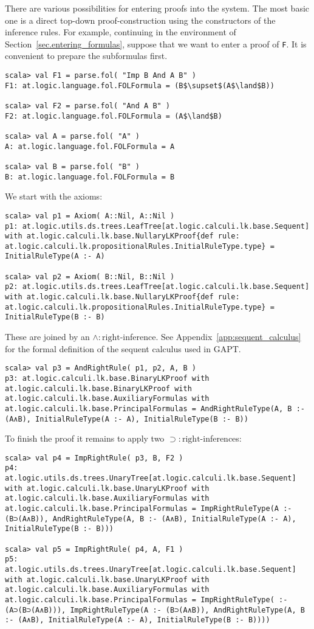 \documentclass[a4paper,11pt]{article}
\newcommand{\impl}{\supset} %
\renewcommand{\land}{\wedge}
\begin{document}
There are various possibilities for entering proofs into the system. The most
basic one is a direct top-down proof-construction using the constructors
of the inference rules. For example, continuing in the environment of
Section~\ref{sec.entering_formulas}, suppose that we want to enter a
proof of \texttt{F}. It is convenient to prepare the subformulas first.
\begin{lstlisting}
scala> val F1 = parse.fol( "Imp B And A B" )
F1: at.logic.language.fol.FOLFormula = (B$\supset$(A$\land$B))

scala> val F2 = parse.fol( "And A B" )
F2: at.logic.language.fol.FOLFormula = (A$\land$B)

scala> val A = parse.fol( "A" )
A: at.logic.language.fol.FOLFormula = A

scala> val B = parse.fol( "B" )
B: at.logic.language.fol.FOLFormula = B
\end{lstlisting}
%
We start with the axioms:
%
\begin{lstlisting}
scala> val p1 = Axiom( A::Nil, A::Nil )
p1: at.logic.utils.ds.trees.LeafTree[at.logic.calculi.lk.base.Sequent] with at.logic.calculi.lk.base.NullaryLKProof{def rule: at.logic.calculi.lk.propositionalRules.InitialRuleType.type} = InitialRuleType(A :- A)

scala> val p2 = Axiom( B::Nil, B::Nil )
p2: at.logic.utils.ds.trees.LeafTree[at.logic.calculi.lk.base.Sequent] with at.logic.calculi.lk.base.NullaryLKProof{def rule: at.logic.calculi.lk.propositionalRules.InitialRuleType.type} = InitialRuleType(B :- B)
\end{lstlisting}
%
These are joined by an $\land:\mathrm{right}$-inference. See Appendix~\ref{app:sequent_calculus}
for the formal definition of the sequent calculus used in GAPT.
%
\begin{lstlisting}
scala> val p3 = AndRightRule( p1, p2, A, B )
p3: at.logic.calculi.lk.base.BinaryLKProof with at.logic.calculi.lk.base.BinaryLKProof with at.logic.calculi.lk.base.AuxiliaryFormulas with at.logic.calculi.lk.base.PrincipalFormulas = AndRightRuleType(A, B :- (A∧B), InitialRuleType(A :- A), InitialRuleType(B :- B))
\end{lstlisting}
%
To finish the proof it remains to apply two $\impl:\mathrm{right}$-inferences:
%
\begin{lstlisting}
scala> val p4 = ImpRightRule( p3, B, F2 )
p4: at.logic.utils.ds.trees.UnaryTree[at.logic.calculi.lk.base.Sequent] with at.logic.calculi.lk.base.UnaryLKProof with at.logic.calculi.lk.base.AuxiliaryFormulas with at.logic.calculi.lk.base.PrincipalFormulas = ImpRightRuleType(A :- (B⊃(A∧B)), AndRightRuleType(A, B :- (A∧B), InitialRuleType(A :- A), InitialRuleType(B :- B)))

scala> val p5 = ImpRightRule( p4, A, F1 )
p5: at.logic.utils.ds.trees.UnaryTree[at.logic.calculi.lk.base.Sequent] with at.logic.calculi.lk.base.UnaryLKProof with at.logic.calculi.lk.base.AuxiliaryFormulas with at.logic.calculi.lk.base.PrincipalFormulas = ImpRightRuleType( :- (A⊃(B⊃(A∧B))), ImpRightRuleType(A :- (B⊃(A∧B)), AndRightRuleType(A, B :- (A∧B), InitialRuleType(A :- A), InitialRuleType(B :- B))))
\end{lstlisting}
\end{document}
